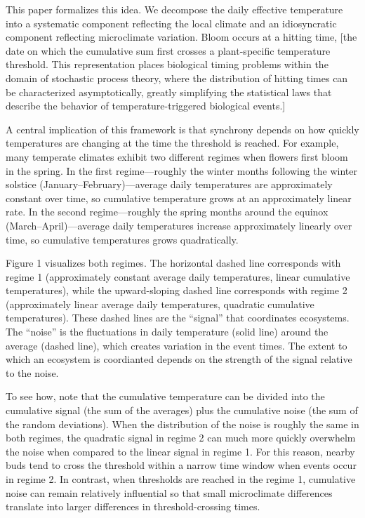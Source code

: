 This paper formalizes this idea. We decompose the daily effective
temperature into a systematic component reflecting the local climate and
an idiosyncratic component reflecting microclimate variation. Bloom
occurs at a hitting time, [the date on which the cumulative sum first
crosses a plant-specific temperature threshold. This representation
places biological timing problems within the domain of stochastic
process theory, where the distribution of hitting times can be
characterized asymptotically, greatly simplifying the statistical laws
that describe the behavior of temperature-triggered biological events.]

A central implication of this framework is that synchrony depends on how
quickly temperatures are changing at the time the threshold is reached.
For example, many temperate climates exhibit two different regimes when
flowers first bloom in the spring. In the first regime---roughly the
winter months following the winter solstice (January--February)---average daily
temperatures are approximately constant over time, so cumulative
temperature grows at an approximately linear rate. In the second
regime---roughly the spring months around the equinox
(March--April)---average daily temperatures increase approximately
linearly over time, so cumulative temperatures grows quadratically.

Figure 1 visualizes both regimes. The horizontal dashed line corresponds
with regime 1 (approximately constant average daily temperatures, linear
cumulative temperatures), while the upward-sloping dashed line
corresponds with regime 2 (approximately linear average daily
temperatures, quadratic cumulative temperatures). These dashed lines are
the ``signal'' that coordinates ecosystems. The ``noise'' is the
fluctuations in daily temperature (solid line) around the average
(dashed line), which creates variation in the event times. The extent to
which an ecosystem is coordianted depends on the strength of the signal
relative to the noise.

To see how, note that the cumulative temperature can be divided into the
cumulative signal (the sum of the averages) plus the cumulative noise
(the sum of the random deviations). When the distribution of the noise
is roughly the same in both regimes, the quadratic signal in regime 2
can much more quickly overwhelm the noise when compared to the linear
signal in regime 1. For this reason, nearby buds tend to cross the
threshold within a narrow time window when events occur in regime 2. In
contrast, when thresholds are reached in the regime 1, cumulative noise
can remain relatively influential so that small microclimate differences
translate into larger differences in threshold-crossing times.

